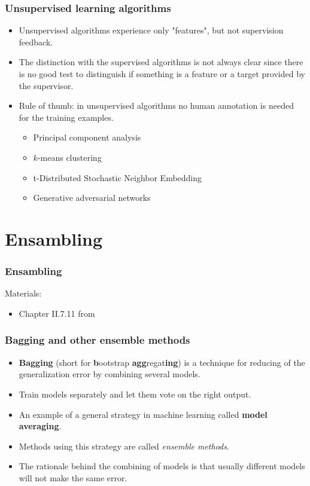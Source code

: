 \documentclass[notes]{beamer}          %
\newif\iffull
\begin{document}
\begin{frame}
\frametitle{Unsupervised learning algorithms}
    \begin{itemize}
        \item Unsupervised algorithms experience only "features", but not supervision feedback.
        \item The distinction with the supervised algorithms is not always clear since there is no good test to distinguish if something is a feature or a target provided by the supervisor.
        \item Rule of thumb: in unsupervised algorithms no human annotation is needed for the training examples.
        \begin{itemize}
            \item Principal component analysis
            \item $k$-means clustering
            \item t-Distributed Stochastic Neighbor Embedding
            \item Generative adversarial networks
        \end{itemize}
    \end{itemize}
\end{frame}

\fi %

\iffull %
\section{Ensambling}

\begin{frame}
\frametitle{Ensambling}
Materials:
\begin{itemize}
    \item Chapter II.7.11 from \cite{deeplearning}
\end{itemize}
\end{frame}

\begin{frame}
\frametitle{Bagging and other ensemble methods}
    \begin{itemize}
        \item {\bf Bagging} (short for {\bf b}ootstrap {\bf agg}regat{\bf ing}) is a technique for reducing of the generalization error by combining several models.
        \item Train models separately and let them vote on the right output.
        \item An example of a general strategy in machine learning called {\bf model averaging}.
        \item Methods using this strategy are called {\em ensemble methods}.
        \item The rationale behind the combining of models is that usually different models will not make the same error.
    \end{itemize}
\end{frame}
\end{document}
